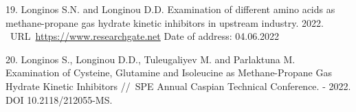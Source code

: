 \begin{refs}
19. Longinos S.N. and Longinou D.D. Examination of different amino acids
as methane-propane gas hydrate kinetic inhibitors in upstream industry.
2022. ~URL~\href{https://www.researchgate.net/profile/Sotirios-\%C2\%A0Longinos/publication/361040342_EXAMINATION_OF_DIFFERENT_AMINO_ACIDS_AS_METHANE-\%C2\%A0PROPANE_GAS_HYDRATE_KINETIC_INHIBITORS_IN_UPSTREAM_INDUSTRY/links/629926fd6886635d5cb871a0/EXAMINATION-OF-DIFFERENT-AMINO-ACIDS-AS-METHANE-PROPANE-GAS-HYDRATE-KINETIC-INHIBITORS-IN-UPSTREAM-INDUSTRY.pdf}{https://www.researchgate.net} Date of address: 04.06.2022

20. Longinos S., Longinou D.D., Tuleugaliyev M. and Parlaktuna M.
Examination of Cysteine, Glutamine and Isoleucine as Methane-Propane Gas
Hydrate Kinetic Inhibitors //~SPE Annual Caspian Technical Conference. -
2022. DOI 10.2118/212055-MS.
\end{refs}

